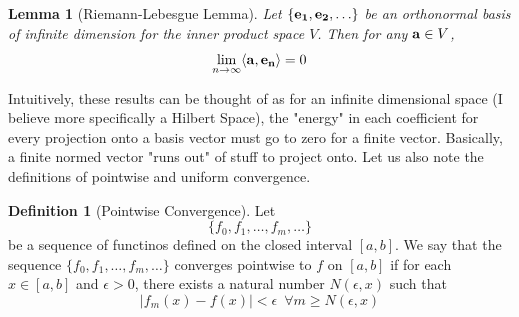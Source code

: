 \documentclass{report}
\newtheorem{lemma}[theorem]{Lemma}
\theoremstyle{definition}
\newtheorem{definition}[theorem]{Definition}
\theoremstyle{remark}
\begin{document}
\begin{lemma}[Riemann-Lebesgue Lemma]
    Let $\{\bold{e_1,e_2,}\ldots\}$ be an orthonormal basis of infinite dimension for the inner product space $V$. Then for any $\bold{a}\in V$, 
    \begin{equation*}
        \lim_{n\rightarrow \infty}\langle\bold{a,e_n}\rangle = 0
    \end{equation*}
\end{lemma}
Intuitively, these results can be thought of as for an infinite dimensional space (I believe more specifically a Hilbert Space), the "energy" in each coefficient for every projection onto a basis vector must go to zero for a finite vector. Basically, a finite normed vector "runs out" of stuff to project onto. Let us also note the definitions of pointwise and uniform convergence.
\begin{definition}[Pointwise Convergence]
    Let \begin{equation*}
        \{f_0,f_1,\ldots,f_m,\ldots\}
    \end{equation*}
    be a sequence of functinos defined on the closed interval $[a,b]$. We say that the sequence $\{f_0,f_1,\ldots,f_m,\ldots\}$ converges pointwise to $f$ on $[a,b]$ if for each $x\in [a,b]$ and $\epsilon>0$, there exists a natural number $N(\epsilon,x)$ such that \begin{equation*}
        |f_m(x)-f(x)|<\epsilon \,\,\, \forall m \geq N(\epsilon,x)
    \end{equation*}
\end{definition}
\end{document}
